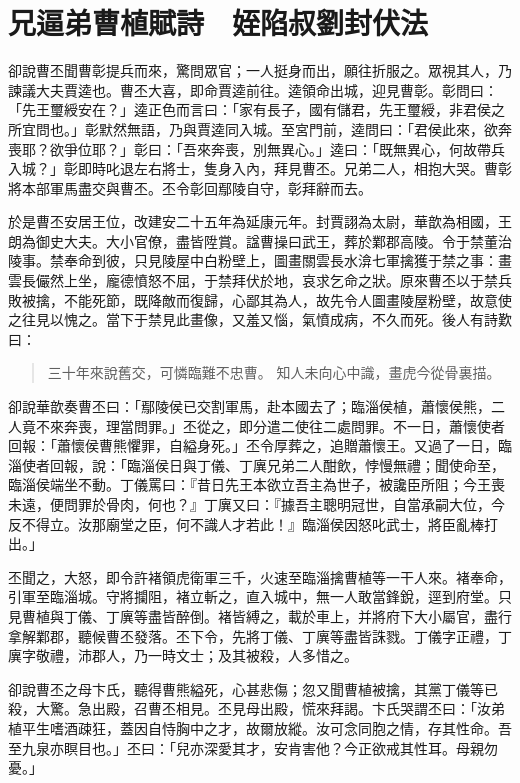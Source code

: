 
\chapter{兄逼弟曹植賦詩　姪陷叔劉封伏法}

卻說曹丕聞曹彰提兵而來，驚問眾官；一人挺身而出，願往折服之。眾視其人，乃諫議大夫賈逵也。曹丕大喜，即命賈逵前往。逵領命出城，迎見曹彰。彰問曰：「先王璽綬安在？」逵正色而言曰：「家有長子，國有儲君，先王璽綬，非君侯之所宜問也。」彰默然無語，乃與賈逵同入城。至宮門前，逵問曰：「君侯此來，欲奔喪耶？欲爭位耶？」彰曰：「吾來奔喪，別無異心。」逵曰：「既無異心，何故帶兵入城？」彰即時叱退左右將士，隻身入內，拜見曹丕。兄弟二人，相抱大哭。曹彰將本部軍馬盡交與曹丕。丕令彰回鄢陵自守，彰拜辭而去。

於是曹丕安居王位，改建安二十五年為延康元年。封賈詡為太尉，華歆為相國，王朗為御史大夫。大小官僚，盡皆陞賞。諡曹操曰武王，葬於鄴郡高陵。令于禁董治陵事。禁奉命到彼，只見陵屋中白粉壁上，圖畫關雲長水渰七軍擒獲于禁之事：畫雲長儼然上坐，龐德憤怒不屈，于禁拜伏於地，哀求乞命之狀。原來曹丕以于禁兵敗被擒，不能死節，既降敵而復歸，心鄙其為人，故先令人圖畫陵屋粉壁，故意使之往見以愧之。當下于禁見此畫像，又羞又惱，氣憤成病，不久而死。後人有詩歎曰：

\begin{quote}
三十年來說舊交，可憐臨難不忠曹。
知人未向心中識，畫虎今從骨裏描。
\end{quote}

卻說華歆奏曹丕曰：「鄢陵侯已交割軍馬，赴本國去了；臨淄侯植，蕭懷侯熊，二人竟不來奔喪，理當問罪。」丕從之，即分遣二使往二處問罪。不一日，蕭懷使者回報：「蕭懷侯曹熊懼罪，自縊身死。」丕令厚葬之，追贈蕭懷王。又過了一日，臨淄使者回報，說：「臨淄侯日與丁儀、丁廙兄弟二人酣飲，悖慢無禮；聞使命至，臨淄侯端坐不動。丁儀罵曰：『昔日先王本欲立吾主為世子，被讒臣所阻；今王喪未遠，便問罪於骨肉，何也？』丁廙又曰：『據吾主聰明冠世，自當承嗣大位，今反不得立。汝那廟堂之臣，何不識人才若此！』臨淄侯因怒叱武士，將臣亂棒打出。」

丕聞之，大怒，即令許褚領虎衛軍三千，火速至臨淄擒曹植等一干人來。褚奉命，引軍至臨淄城。守將攔阻，褚立斬之，直入城中，無一人敢當鋒銳，逕到府堂。只見曹植與丁儀、丁廙等盡皆醉倒。褚皆縛之，載於車上，并將府下大小屬官，盡行拿解鄴郡，聽候曹丕發落。丕下令，先將丁儀、丁廙等盡皆誅戮。丁儀字正禮，丁廙字敬禮，沛郡人，乃一時文士；及其被殺，人多惜之。

卻說曹丕之母卞氏，聽得曹熊縊死，心甚悲傷；忽又聞曹植被擒，其黨丁儀等已殺，大驚。急出殿，召曹丕相見。丕見母出殿，慌來拜謁。卞氏哭謂丕曰：「汝弟植平生嗜酒疎狂，蓋因自恃胸中之才，故爾放縱。汝可念同胞之情，存其性命。吾至九泉亦瞑目也。」丕曰：「兒亦深愛其才，安肯害他？今正欲戒其性耳。母親勿憂。」

